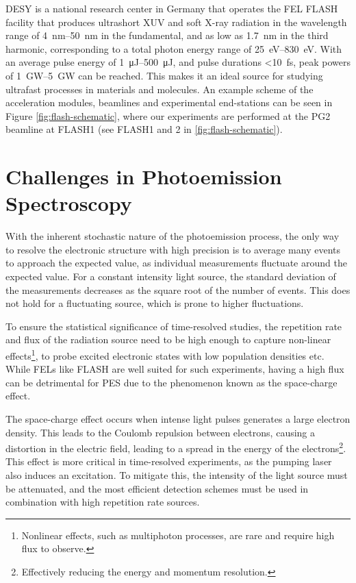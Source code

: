 \gls{DESY} is a national research center in Germany that operates the \gls{FEL} \gls{FLASH} facility \cite{ackermannOperationFreeelectronLaser2007,tiedtkeSoftXrayFreeelectron2009} that produces ultrashort \gls{XUV} and soft X-ray radiation in the wavelength range of \qtyrange{4}{50}{\nm} in the fundamental, and as low as \qty{1.7}{\nm} in the third harmonic, corresponding to a total photon energy range of \qtyrange{25}{830}{\eV}. With an average pulse energy of \qtyrange{1}{500}{\micro\joule}, and pulse durations \qty{<10}{\fs}, peak powers of \qtyrange{1}{5}{\giga\watt} can be reached. This makes it an ideal source for studying ultrafast processes in materials and molecules. An example scheme of the acceleration modules, \glspl{beamline} and experimental end-stations can be seen in Figure \ref{fig:flash-schematic}, where our experiments are performed at the PG2 beamline at FLASH1 (see FLASH1 and 2 in \cref{fig:flash-schematic}).

\section{Challenges in Photoemission Spectroscopy}
With the inherent stochastic nature of the photoemission process, the only way to resolve the electronic structure with high precision is to average many events to approach the expected value, as individual measurements fluctuate around the expected value. For a constant intensity light source, the standard deviation of the measurements decreases as the square root of the number of events. This does not hold for a fluctuating source, which is prone to higher fluctuations. 

To ensure the statistical significance of time-resolved studies, the repetition rate and flux of the radiation source need to be high enough to capture non-linear effects\footnote{Nonlinear effects, such as multiphoton processes, are rare and require high flux to observe.}, to probe excited electronic states with low population densities etc. While \glspl{FEL} like \gls{FLASH} are well suited for such experiments, having a high flux can be detrimental for \gls{PES} due to the phenomenon known as the space-charge effect.

The space-charge effect occurs when intense light pulses generates a large electron density. This leads to the Coulomb repulsion between electrons, causing a distortion in the electric field, leading to a spread in the energy of the electrons\footnote{Effectively reducing the energy and momentum resolution.}. This effect is more critical in time-resolved experiments, as the pumping laser also induces an excitation. To mitigate this, the intensity of the light source must be attenuated, and the most efficient detection schemes must be used in combination with high repetition rate sources.


